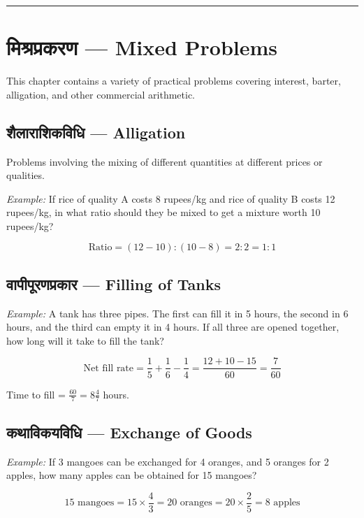 \documentclass[11pt,a4paper]{book}
\newcommand{\longline}{\noindent\rule{\textwidth}{0.4pt}}
\begin{document}
\longline

\chapter{मिश्रप्रकरण — Mixed Problems}
\label{chap:mishra}

This chapter contains a variety of practical problems covering interest, barter, alligation, and other commercial arithmetic.

\section{शैलाराशिकविधि — Alligation}

Problems involving the mixing of different quantities at different prices or qualities.

\textit{Example:} If rice of quality A costs 8 rupees/kg and rice of quality B costs 12 rupees/kg, in what ratio should they be mixed to get a mixture worth 10 rupees/kg?

\[
\text{Ratio} = (12 - 10) : (10 - 8) = 2 : 2 = 1 : 1
\]

\section{वापीपूरणप्रकार — Filling of Tanks}

\textit{Example:} A tank has three pipes. The first can fill it in 5 hours, the second in 6 hours, and the third can empty it in 4 hours. If all three are opened together, how long will it take to fill the tank?

\[
\text{Net fill rate} = \frac{1}{5} + \frac{1}{6} - \frac{1}{4} = \frac{12 + 10 - 15}{60} = \frac{7}{60}
\]

Time to fill = $\frac{60}{7} = 8\frac{4}{7}$ hours.

\section{कथाविकयविधि — Exchange of Goods}

\textit{Example:} If 3 mangoes can be exchanged for 4 oranges, and 5 oranges for 2 apples, how many apples can be obtained for 15 mangoes?

\[
15 \text{ mangoes} = 15 \times \frac{4}{3} = 20 \text{ oranges} = 20 \times \frac{2}{5} = 8 \text{ apples}
\]
\end{document}
